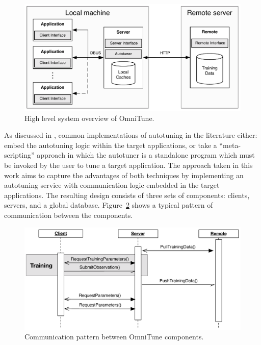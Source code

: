 
\begin{figure}
\centering
\includegraphics[width=.9\textwidth]{img/omnitune-system-overview.pdf}
\caption{%
  High level system overview of OmniTune.%
}
\label{fig:omnitune-system-overview}
\end{figure}

As discussed in , common implementations of
autotuning in the literature either: embed the autotuning logic within
the target applications, or take a ``meta-scripting'' approach in
which the autotuner is a standalone program which must be invoked by
the user to tune a target application. The approach taken in this work
aims to capture the advantages of both techniques by implementing an
autotuning service with communication logic embedded in the target
applications. The resulting design consists of three sets of
components: clients, servers, and a global
database. Figure~\ref{fig:omnitune-comms} shows a typical pattern of
communication between the components.

\begin{figure}
\centering
\includegraphics[width=\textwidth]{img/omnitune-comms.pdf}
\caption{%
  Communication pattern between OmniTune components.%
}
\label{fig:omnitune-comms}
\end{figure}

